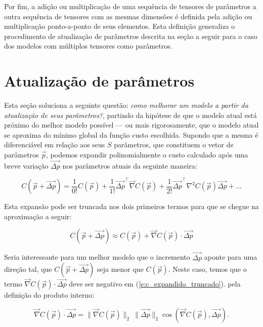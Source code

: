     Por fim, a adição ou multiplicação de uma sequência de tensores de parâmetros a outra sequência de tensores com as mesmas dimensões é definida pela adição ou multiplicação ponto-a-ponto de seus elementos. Esta definição generaliza o procedimento de atualização de parâmetros descrita na seção a seguir para o caso dos modelos com múltiplos tensores como parâmetros.


  \section{Atualização de parâmetros} \label{s:metodos_gradiente}

    Esta seção soluciona a seguinte questão: \emph{como melhorar um modelo a partir da atualização de seus parâmetros?}, partindo da hipótese de que o modelo atual está próximo do melhor modelo possível --- ou mais rigorosamente, que o modelo atual se aproxima do mínimo global da função custo escolhida. Supondo que a mesma é diferenciável em relação aos seus $S$ parâmetros, que constituem o vetor de parâmetros $\vec{p}$, podemos expandir polinomialmente o custo calculado após uma breve variação $\vec{\Delta p}$ nos parâmetros atuais da seguinte maneira:

    \begin{equation} \label{e:c_expandido}
      C(\vec{p} + \vec{\Delta p}) =
      \frac{1}{0!} C(\vec{p}) +
      \frac{1}{1!} \vec{\Delta p}^{\top} \vec{\nabla} C(\vec{p}) +
      \frac{1}{2!} \vec{\Delta p}^{\top} \nabla^2 C(\vec{p}) \vec{\Delta p} +
      \ldots
    \end{equation}

    Esta expansão pode ser truncada nos dois primeiros termos para que se chegue na aproximação a seguir:

    \begin{equation} \label{e:c_expandido_truncado}
      C(\vec{p} + \vec{\Delta p}) \approx
      C(\vec{p}) +
      \vec{\nabla} C(\vec{p}) \cdot \vec{\Delta p}
    \end{equation}

    Seria interessante para um melhor modelo que o incremento $\vec{\Delta p}$ aponte para uma direção tal, que $C(\vec{p} + \vec{\Delta p})$ seja menor que $C(\vec{p})$. Neste caso, temos que o termo $\vec{\nabla} C(\vec{p}) \cdot \vec{\Delta p}$ deve ser negativo em (\ref{e:c_expandido_truncado}). \DIFdelbegin {}\DIFdelend \DIFaddbegin {}\DIFaddend pela definição do produto interno:

    \begin{equation} \label{e:grad_c_delta_p}
      \vec{\nabla} C(\vec{p}) \cdot \vec{\Delta p} = \|\vec{\nabla} C(\vec{p})\|_2\ \|\vec{\Delta p}\|_2 \cos(\vec{\nabla} C(\vec{p}), \vec{\Delta p})
      .
    \end{equation}

